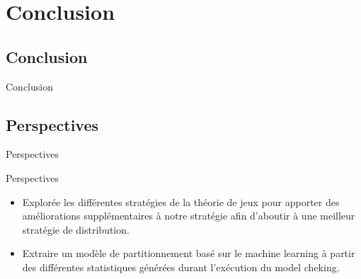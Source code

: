\section{Conclusion}
\subsection{Conclusion}
\begin{frame}{Conclusion}
 
\end{frame}

\subsection{Perspectives}
\begin{frame}{Perspectives}
\begin{block}{Perspectives}
	\begin{itemize}[<+->]
		\transdissolve
		\item   Explorée les différentes stratégies de la théorie de jeux pour apporter des améliorations supplémentaires à notre stratégie afin d’aboutir à une meilleur stratégie de distribution.
		\item  Extraire un modèle de partitionnement basé sur le machine learning à partir des différentes statistiques générées durant l’exécution du model cheking.
	\end{itemize}
 
\end{block}
\end{frame}
